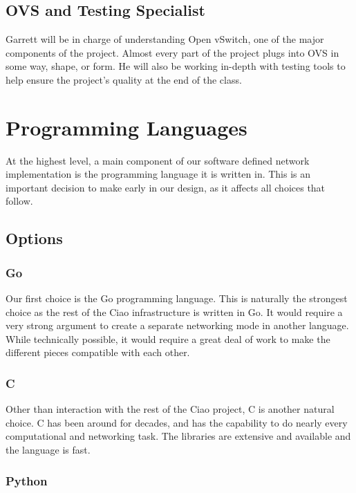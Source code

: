 \documentclass[10pt,letterpaper,onecolumn,journal]{IEEEtran}
\begin{document}
\subsection{OVS and Testing Specialist}
Garrett will be in charge of understanding Open vSwitch, one of the major
components of the project. Almost every part of the project plugs into OVS in
some way, shape, or form. He will also be working in-depth with testing tools
to help ensure the project's quality at the end of the class.

\section{Programming Languages}

At the highest level, a main component of our software defined network
implementation is the programming language it is written in. This is an
important decision to make early in our design, as it affects all choices that
follow.

\subsection{Options}

\subsubsection{Go}

Our first choice is the Go programming language. This is naturally the strongest
choice as the rest of the Ciao infrastructure is written in Go. It would require
a very strong argument to create a separate networking mode in another language.
While technically possible, it would require a great deal of work to make the
different pieces compatible with each other.

\subsubsection{C}

Other than interaction with the rest of the Ciao project, C is another natural
choice. C has been around for decades, and has the capability to do nearly every
computational and networking task. The libraries are extensive and available and
the language is fast.

\subsubsection{Python}
\end{document}
